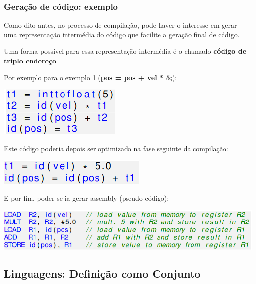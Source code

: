 \documentclass{article}
\begin{document}
\subsubsection{Geração de código: exemplo}

\begin{flushleft}
  \item Como dito antes, no processo de compilação, pode haver o interesse em
  gerar uma representação intermédia do código que facilite
  a geração final de código.
  \item Uma forma possível para essa representação intermédia
  é o chamado \textbf{código de triplo endereço}.
  \item Por exemplo para o exemplo 1 (\textbf{pos = pos + vel * 5;}):
  \begin{center}
    \includegraphics[scale=0.4]{10}
  \end{center}
  Este código poderia depois ser optimizado na fase
  seguinte da compilação:
  \begin{center}
    \includegraphics[scale=0.4]{11}
  \end{center}
  E por fim, poder-se-ia gerar assembly (pseudo-código):
  \begin{center}
    \includegraphics[scale=0.4]{12}
  \end{center}
\end{flushleft}

\pagebreak

\subsection{Linguagens: Definição como Conjunto}
\end{document}
